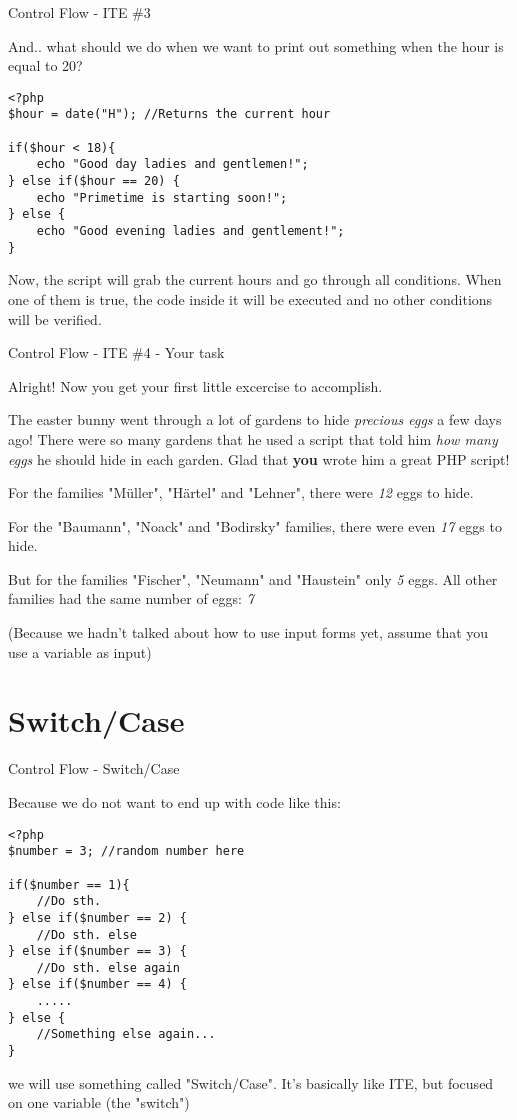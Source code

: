 \begin{frame}[fragile]{Control Flow - ITE \#{}3}

And.. what should we do when we want to print out something when the hour is equal to 20? \pause
\begin{lstlisting}
<?php
$hour = date("H"); //Returns the current hour

if($hour < 18){
	echo "Good day ladies and gentlemen!";
} else if($hour == 20) {
    echo "Primetime is starting soon!";
} else {
    echo "Good evening ladies and gentlement!";
}
\end{lstlisting} 
\pause

Now, the script will grab the current hours and go through all conditions. When one of them is true, the code inside it will be executed and no other conditions will be verified.
\end{frame}

\begin{frame}[fragile]{Control Flow - ITE \#{}4 - Your task}

Alright! Now you get your first little excercise to accomplish. \pause

The easter bunny went through a lot of gardens to hide \emph{precious eggs} a few days ago! There were so many gardens that he used a script that told him \emph{how many eggs} he should hide in each garden. Glad that \textbf{you} wrote him a great PHP script!

For the families "Müller", "Härtel" and "Lehner", there were \emph{12} eggs to hide. 

For the "Baumann", "Noack" and "Bodirsky" families, there were even \emph{17} eggs to hide.

But for the families "Fischer", "Neumann" and "Haustein" only \emph{5} eggs. All other families had the same number of eggs: \emph{7}

(Because we hadn't talked about how to use input forms yet, assume that you use a variable as input) 
\end{frame}

\section{Switch/Case}

\begin{frame}[fragile]{Control Flow - Switch/Case}

Because we do not want to end up with code like this:
\begin{lstlisting}
<?php
$number = 3; //random number here

if($number == 1){
	//Do sth.
} else if($number == 2) {
    //Do sth. else 
} else if($number == 3) {
    //Do sth. else again
} else if($number == 4) {
    .....
} else {
    //Something else again...
}
\end{lstlisting} 
\pause

we will use something called "Switch/Case". It's basically like ITE, but focused on one variable (the "switch")

\end{frame}

